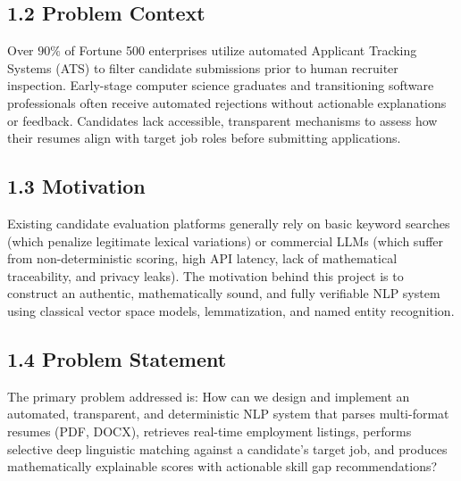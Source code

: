 \documentclass[11pt,a4paper]{article}
\begin{document}
\subsection{1.2 Problem Context}
Over $90\%$ of Fortune 500 enterprises utilize automated Applicant Tracking Systems (ATS) to filter candidate submissions prior to human recruiter inspection. Early-stage computer science graduates and transitioning software professionals often receive automated rejections without actionable explanations or feedback. Candidates lack accessible, transparent mechanisms to assess how their resumes align with target job roles before submitting applications.

\subsection{1.3 Motivation}
Existing candidate evaluation platforms generally rely on basic keyword searches (which penalize legitimate lexical variations) or commercial LLMs (which suffer from non-deterministic scoring, high API latency, lack of mathematical traceability, and privacy leaks). The motivation behind this project is to construct an authentic, mathematically sound, and fully verifiable NLP system using classical vector space models, lemmatization, and named entity recognition.

\subsection{1.4 Problem Statement}
The primary problem addressed is: How can we design and implement an automated, transparent, and deterministic NLP system that parses multi-format resumes (PDF, DOCX), retrieves real-time employment listings, performs selective deep linguistic matching against a candidate's target job, and produces mathematically explainable scores with actionable skill gap recommendations?
\end{document}
